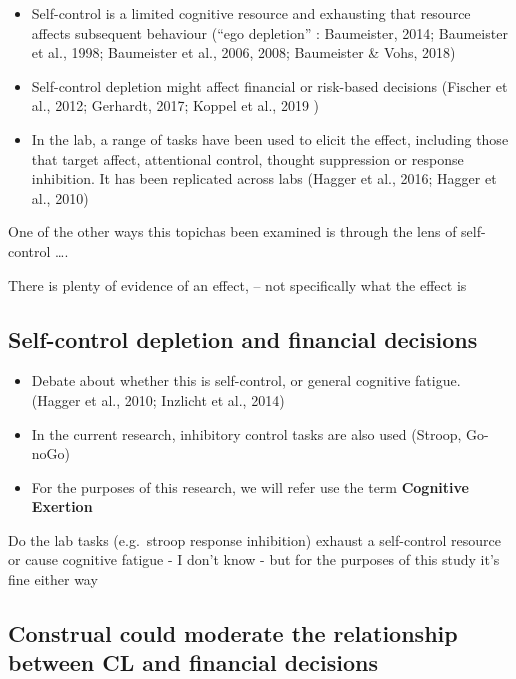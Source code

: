 \documentclass[
  letterpaper,
  DIV=11,
  numbers=noendperiod]{scrartcl}
\begin{document}
\begin{itemize}
\item
  Self-control is a limited cognitive resource and exhausting that
  resource affects subsequent behaviour (``ego depletion'' : Baumeister,
  2014; Baumeister et al., 1998; Baumeister et al., 2006, 2008;
  Baumeister \& Vohs, 2018)
\item
  Self-control depletion might affect financial or risk-based decisions
  (Fischer et al., 2012; Gerhardt, 2017; Koppel et al., 2019 )
\item
  In the lab, a range of tasks have been used to elicit the effect,
  including those that target affect, attentional control, thought
  suppression or response inhibition. It has been replicated across labs
  (Hagger et al., 2016; Hagger et al., 2010)
\end{itemize}

One of the other ways this topichas been examined is through the lens of
self-control \ldots.

There is plenty of evidence of an effect, -- not specifically what the
effect is

\hypertarget{self-control-depletion-and-financial-decisions-1}{%
\subsection{Self-control depletion and financial
decisions}\label{self-control-depletion-and-financial-decisions-1}}

\begin{itemize}
\item
  Debate about whether this is self-control, or general cognitive
  fatigue. (Hagger et al., 2010; Inzlicht et al., 2014)
\item
  In the current research, inhibitory control tasks are also used
  (Stroop, Go-noGo)
\item
  For the purposes of this research, we will refer use the term
  \textbf{Cognitive Exertion}
\end{itemize}

Do the lab tasks (e.g.~stroop response inhibition) exhaust a
self-control resource or cause cognitive fatigue - I don't know - but
for the purposes of this study it's fine either way

\hypertarget{construal-could-moderate-the-relationship-between-cl-and-financial-decisions}{%
\subsection{Construal could moderate the relationship between CL and
financial
decisions}\label{construal-could-moderate-the-relationship-between-cl-and-financial-decisions}}
\end{document}

